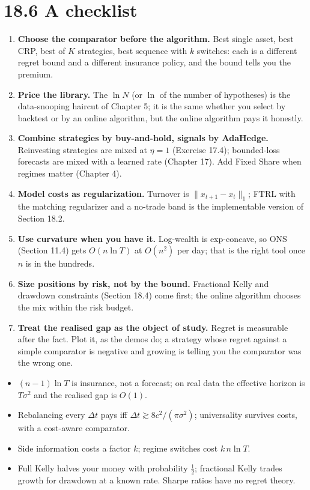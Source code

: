\documentclass[11pt,a4paper,openany]{book}
\newcommand{\norm}[1]{\lVert #1\rVert}
\begin{document}
\section*{18.6 A checklist}\label{ch18-checklist}

\begin{enumerate}
\item \textbf{Choose the comparator before the algorithm.} Best single asset, best CRP, best of $K$ strategies, best sequence with $k$ switches: each is a different regret bound and a different insurance policy, and the bound tells you the premium.
\item \textbf{Price the library.} The $\ln N$ (or $\ln$ of the number of hypotheses) is the data-snooping haircut of Chapter 5; it is the same whether you select by backtest or by an online algorithm, but the online algorithm pays it honestly.
\item \textbf{Combine strategies by buy-and-hold, signals by AdaHedge.} Reinvesting strategies are mixed at $\eta=1$ (Exercise 17.4); bounded-loss forecasts are mixed with a learned rate (Chapter 17). Add Fixed Share when regimes matter (Chapter 4).
\item \textbf{Model costs as regularization.} Turnover is $\norm{x_{t+1}-x_t}_1$; FTRL with the matching regularizer and a no-trade band is the implementable version of Section 18.2.
\item \textbf{Use curvature when you have it.} Log-wealth is exp-concave, so ONS (Section 11.4) gets $O(n\ln T)$ at $O(n^2)$ per day; that is the right tool once $n$ is in the hundreds.
\item \textbf{Size positions by risk, not by the bound.} Fractional Kelly and drawdown constraints (Section 18.4) come first; the online algorithm chooses the mix within the risk budget.
\item \textbf{Treat the realised gap as the object of study.} Regret is measurable after the fact. Plot it, as the demos do; a strategy whose regret against a simple comparator is negative and growing is telling you the comparator was the wrong one.
\end{enumerate}

\begin{takeaways}
\begin{itemize}
\item $(n-1)\ln T$ is insurance, not a forecast; on real data the effective horizon is $T\sigma^2$ and the realised gap is $O(1)$.
\item Rebalancing every $\Delta t$ pays iff $\Delta t\gtrsim8c^2/(\pi\sigma^2)$; universality survives costs, with a cost-aware comparator.
\item Side information costs a factor $k$; regime switches cost $k\,n\ln T$.
\item Full Kelly halves your money with probability $\tfrac12$; fractional Kelly trades growth for drawdown at a known rate. Sharpe ratios have no regret theory.
\end{itemize}
\end{takeaways}
\end{document}
